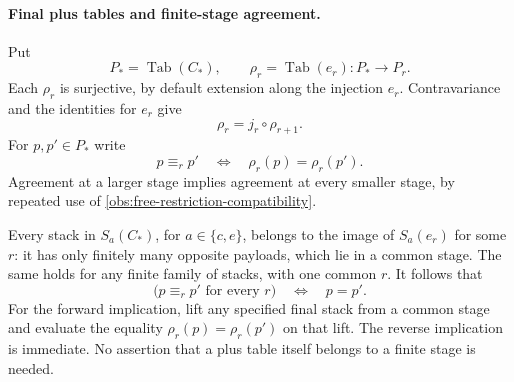 \paragraph{Final plus tables and finite-stage agreement.}
Put
\begin{equation}
  P_*=\operatorname{Tab}(C_*),
  \qquad
  \rho_r=\operatorname{Tab}(e_r):P_*\longrightarrow P_r.
  \label{obs:free-final-plus}
\end{equation}
Each $\rho_r$ is surjective, by default extension along the injection
$e_r$.  Contravariance and the identities for $e_r$ give
\begin{equation}
  \rho_r=j_r\circ\rho_{r+1}.
  \label{obs:free-restriction-compatibility}
\end{equation}
For $p,p'\in P_*$ write
\begin{equation}
  p\equiv_r p' \quad\Longleftrightarrow\quad
           \rho_r(p)=\rho_r(p').
  \label{obs:free-equivalence}
\end{equation}
Agreement at a larger stage implies agreement at every smaller
stage, by repeated use of
\eqref{obs:free-restriction-compatibility}.

Every stack in $S_a(C_*)$, for $a\in\{c,e\}$, belongs to the image
of $S_a(e_r)$ for some $r$: it has only finitely many opposite
payloads, which lie in a common stage.  The same holds for any
finite family of stacks, with one common $r$.  It follows that
\begin{equation}
  \bigl(p\equiv_r p'\text{ for every }r\bigr)
       \quad\Longleftrightarrow\quad p=p'.
  \label{obs:free-separation}
\end{equation}
For the forward implication, lift any specified final stack from a
common stage and evaluate the equality $\rho_r(p)=\rho_r(p')$ on
that lift.  The reverse implication is immediate.  No assertion
that a plus table itself belongs to a finite stage is needed.

